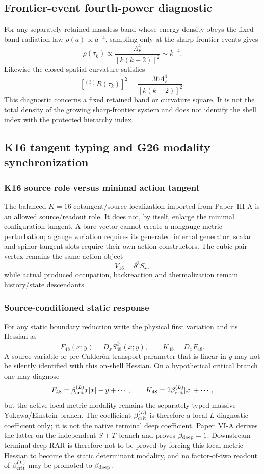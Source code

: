 \documentclass[11pt,a4paper]{article}
\begin{document}
\subsection{Frontier-event fourth-power diagnostic}
\label{p3f:app:v191-frontier-fourth-power-diagnostic}
For any separately retained massless band whose energy density obeys the
fixed-band radiation law $\rho(a)\propto a^{-4}$, sampling only at the sharp
frontier events gives
\[
 \rho(\tau_k)\propto
 \frac{\Lambda_F^4}{[k(k+2)]^2}\sim k^{-4}.
\]
Likewise the closed spatial curvature satisfies
\[
 [{}^{(3)}R(\tau_k)]^2
 =\frac{36\Lambda_F^4}{[k(k+2)]^2}.
\]
This diagnostic concerns a fixed retained band or curvature square.  It is
not the total density of the growing sharp-frontier system and does not
identify the shell index with the protected hierarchy index.




\subsection{K16 tangent typing and G26 modality synchronization}
\label{p3f:sec:v1110-k16-g26-sync}

\subsubsection{K16 source role versus minimal action tangent}
The balanced $K=16$ cotangent/source localization imported from Paper~III-A is
an allowed source/readout role.  It does not, by itself, enlarge the minimal
configuration tangent.  A bare vector cannot create a nongauge metric
perturbation; a gauge variation requires its generated internal generator;
scalar and spinor tangent slots require their own action constructors.  The
cubic pair vertex remains the same-action object
\[
  V_{16}=\delta^3S_\star,
\]
while actual produced occupation, backreaction and thermalization remain
history/state descendants.

\subsubsection{Source-conditioned static response}
For any static boundary reduction write the physical first variation and its
Hessian as
\[
 F_{48}(x;y)=D_xS_{48}^{\partial}(x;y),\qquad
 K_{48}=D_xF_{48}.
\]
A source variable or pre-Calder\'on transport parameter that is linear in $y$
may not be silently identified with this on-shell Hessian.  On a hypothetical
critical branch one may diagnose
\[
 F_{48}=\beta_{\rm crit}^{(L)}x|x|-y+\cdots,\qquad
 K_{48}=2\beta_{\rm crit}^{(L)}|x|+\cdots,
\]
but the active local metric modality remains the separately typed massive
Yukawa/Einstein branch.  The coefficient $\beta_{\rm crit}^{(L)}$ is therefore
a local-$L$ diagnostic coefficient only; it is not the native terminal deep
coefficient.  Paper~VI-A derives the latter on the independent $S+T$ branch
and proves $\beta_{\rm deep}=1$.  Downstream terminal deep RAR is therefore
not to be proved by forcing this local metric Hessian to become the static
determinant modality, and no factor-of-two readout of
$\beta_{\rm crit}^{(L)}$ may be promoted to $\beta_{\rm deep}$.
\end{document}

